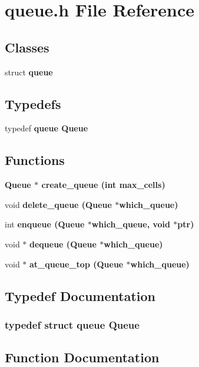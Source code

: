 \section{queue.h File Reference}
\label{queue_8h}
\subsection*{Classes}
\begin{CompactItemize}
\item 
struct \bf{queue}
\end{CompactItemize}
\subsection*{Typedefs}
\begin{CompactItemize}
\item 
typedef \bf{queue} \bf{Queue}
\end{CompactItemize}
\subsection*{Functions}
\begin{CompactItemize}
\item 
\bf{Queue} $\ast$ \bf{create\_\-queue} (int max\_\-cells)
\item 
void \bf{delete\_\-queue} (\bf{Queue} $\ast$which\_\-queue)
\item 
int \bf{enqueue} (\bf{Queue} $\ast$which\_\-queue, void $\ast$ptr)
\item 
void $\ast$ \bf{dequeue} (\bf{Queue} $\ast$which\_\-queue)
\item 
void $\ast$ \bf{at\_\-queue\_\-top} (\bf{Queue} $\ast$which\_\-queue)
\end{CompactItemize}


\subsection{Typedef Documentation}
\subsubsection{\setlength{\rightskip}{0pt plus 5cm}typedef struct \bf{queue} \bf{Queue}}\label{queue_8h_6f23aa91ac8f9ef00f6b1c1a9d017e9a}




\subsection{Function Documentation}
